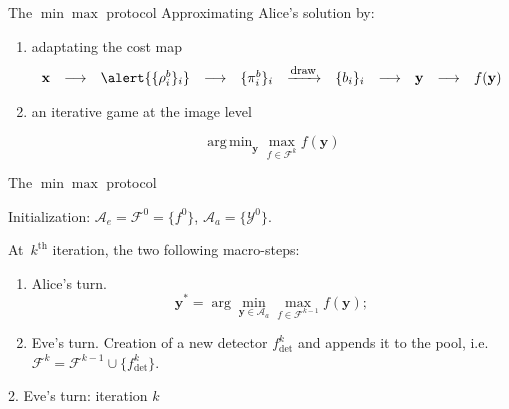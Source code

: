 \documentclass[10pt]{beamer}
\newcommand{\fdet}{f_{\mathrm{det}}}
\newcommand{\fset}{\mathcal{F}}
\DeclareMathOperator*{\argmin}{arg\,min} %
\begin{document}
\begin{frame}{The $\min\max$ protocol}
Approximating Alice's solution by: 

\begin{enumerate}
    \item \alert{adaptating the cost map}
\begin{equation*}
\begin{array}{ccccccccccc}
    \mathbf{x} & \longrightarrow & \alert{\{\rho^b_i\}_i} & \longrightarrow & \{\pi_i^b\}_i &   \xrightarrow{\mbox{\footnotesize{draw}}} & \{b_i\}_i &  \longrightarrow & \mathbf{y} &  \longrightarrow & f(\mathbf{y})
\end{array}
\end{equation*}
    
\pause

    \item \alert{an iterative game at the image level}
    
\begin{equation*}
    \argmin_{\mathbf{y}} \max_{f\in\fset^k} f(\mathbf{y})
\end{equation*}

\end{enumerate}
\end{frame}

\begin{frame}{The $\min\max$ protocol}

Initialization: $\mathcal{A}_e = \fset^{0} = \{f^0\}$,  $\mathcal{A}_a = \{\mathcal{Y}^0\}$.
\pause

At~$k^{\mathrm{th}}$ iteration, the two following macro-steps: 
\begin{enumerate}
	\item \alert<2>{Alice's turn.} 
	\begin{equation}
	\mathbf{y}^\ast = \arg \min_{\mathbf{y} \in \mathcal{A}_a} \max_{f \in \fset^{k-1}} f(\mathbf{y});
	\label{eq:stepone}	
	\end{equation}
    \pause
	\item Eve's turn. Creation of a new detector $\fdet^k$ and appends it to the pool, i.e. $\fset^k = \fset^{k-1} \cup \{\fdet^k\}.$
\end{enumerate}
\end{frame}


\begin{frame}{2. Eve's turn: iteration $k$}







\end{frame}
\end{document}

